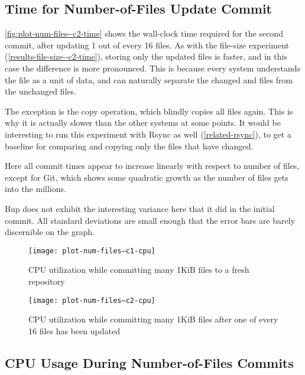 %


\cleardoublepage
\subsection{Time for Number-of-Files Update Commit}

\autoref{fig:plot-num-files--c2-time} shows the wall-clock time required for the
second \gls{commit}, after updating \num{1} out of every \num{16} files. As with
the file-size experiment (\autoref{results-file-size--c2-time}), storing only
the updated files is faster, and in this case the difference is more pronounced.
This is because every system understands the file as a unit of data, and can
naturally separate the changed and files from the unchanged files.

The exception is the copy operation, which blindly copies all files again. This
is why it is actually slower than the other systems at some points. It would be
interesting to run this experiment with Rsync as well (\autoref{related-rsync}),
to get a baseline for comparing and copying only the files that have changed.

Here all commit times appear to increase linearly with respect to number of
files, except for Git, which shows some quadratic growth as the number of files
gets into the millions.

Bup does not exhibit the interesting variance here that it did in the initial
commit. All standard deviations are small enough that the error bars are barely
discernible on the graph.

%


\begin{figure}[p]
    \caption{CPU utilization while committing many 1KiB files to a fresh
    repository}
    \label{fig:plot-num-files--c1-cpu}
    \centering
    \texttt{[image: plot-num-files--c1-cpu]}
\end{figure}

\begin{figure}[p]
    \caption{CPU utilization while committing many 1KiB files after one of every
        \num{16} files has been updated}
    \label{fig:plot-num-files--c2-cpu}
    \centering
    \texttt{[image: plot-num-files--c2-cpu]}
\end{figure}

\cleardoublepage

\subsection{CPU Usage During Number-of-Files Commits}

